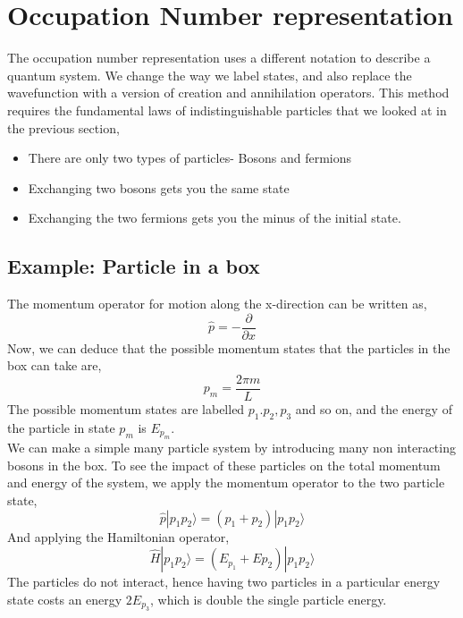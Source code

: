 \section{Occupation Number representation}
The occupation number representation uses a different notation to describe a quantum system. We change the way we label states, and also replace the wavefunction with a version of creation and annihilation operators. This method requires the fundamental laws of indistinguishable particles that we looked at in the previous section,
\begin{itemize}
    \item There are only two types of particles- Bosons and fermions
    \item Exchanging two bosons gets you the same state
    \item Exchanging the two fermions gets you the minus of the initial state.
\end{itemize}
\subsection{Example: Particle in a box}
The momentum operator for motion along the x-direction can be written as,
\begin{equation}
    \hat{p}=-\frac{\partial}{\partial x}
\end{equation}
Now, we can deduce that the possible momentum states that the particles in the box can take are,
\begin{equation}
    p_m=\frac{2\pi m}{L}
\end{equation}
The possible momentum states are labelled $p_1.p_2,p_3$ and so on, and the energy of the particle in state $p_m$ is $E_{p_m}$.\\
We can make a simple many particle system by introducing many non interacting bosons in the box. To see the impact of these particles on the total momentum and energy of the system, we apply the momentum operator to the two particle state,
\begin{equation}
    \hat{p}|p_1p_2\rangle=(p_1+p_2)|p_1p_2\rangle
\end{equation}
And applying the Hamiltonian operator,
\begin{equation}
    \hat{H}|p_1p_2\rangle=(E_{p_1}+E{p_2})|p_1p_2\rangle
\end{equation}
The particles do not interact, hence having two particles in a particular energy state costs an energy $2E_{p_3}$, which is double the single particle energy.
